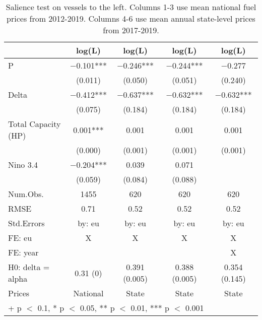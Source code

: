 \begin{table}

\caption{\label{tab:}Salience test on vessels to the left.
             Columns 1-3 use mean national fuel prices from 2012-2019.
             Columns 4-6 use mean annual state-level prices from 2017-2019.}
\centering
\begin{tabular}[t]{lcccc}
\toprule
  & log(L) & log(L)  & log(L)   & log(L)   \\
\midrule
P & \num{-0.101}*** & \num{-0.246}*** & \num{-0.244}*** & \num{-0.277}\\
 & (\num{0.011}) & (\num{0.050}) & (\num{0.051}) & (\num{0.240})\\
Delta & \num{-0.412}*** & \num{-0.637}*** & \num{-0.632}*** & \num{-0.632}***\\
 & (\num{0.075}) & (\num{0.184}) & (\num{0.184}) & (\num{0.184})\\
Total Capacity (HP) & \num{0.001}*** & \num{0.001} & \num{0.001} & \num{0.001}\\
 & (\num{0.000}) & (\num{0.001}) & (\num{0.001}) & (\num{0.001})\\
Nino 3.4 & \num{-0.204}*** & \num{0.039} & \num{0.071} & \\
 & (\num{0.059}) & (\num{0.084}) & (\num{0.088}) & \\
\midrule
Num.Obs. & \num{1455} & \num{620} & \num{620} & \num{620}\\
RMSE & \num{0.71} & \num{0.52} & \num{0.52} & \num{0.52}\\
Std.Errors & by: eu & by: eu & by: eu & by: eu\\
FE: eu & X & X & X & X\\
FE: year &  &  &  & X\\
H0: delta = alpha & 0.31 (0) & 0.391 (0.005) & 0.388 (0.005) & 0.354 (0.145)\\
Prices & National & State & State & State\\
\bottomrule
\multicolumn{5}{l}{\rule{0pt}{1em}+ p $<$ 0.1, * p $<$ 0.05, ** p $<$ 0.01, *** p $<$ 0.001}\\
\end{tabular}
\end{table}
